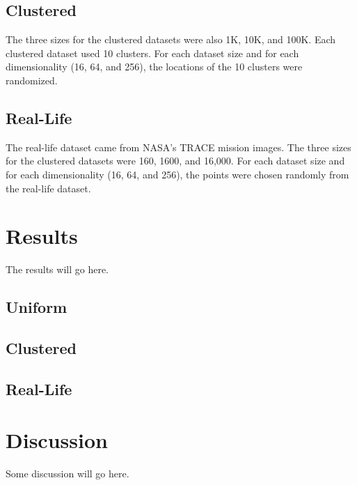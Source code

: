 \documentclass[conference]{IEEEtran}
\begin{document}
\subsection{Clustered}
The three sizes for the clustered datasets were also 1K, 10K, and 100K. Each clustered dataset used 10 clusters. For each dataset size and for each dimensionality (16, 64, and 256), the locations of the 10 clusters were randomized.

\subsection{Real-Life}
The real-life dataset came from NASA's TRACE mission images. The three sizes for the clustered datasets were 160, 1600, and 16,000. For each dataset size and for each dimensionality (16, 64, and 256), the points were chosen randomly from the real-life dataset.

\section{Results}
The results will go here.

\subsection{Uniform}
\subsection{Clustered}
\subsection{Real-Life}

\section{Discussion}
Some discussion will go here.

%
%
\end{document}
